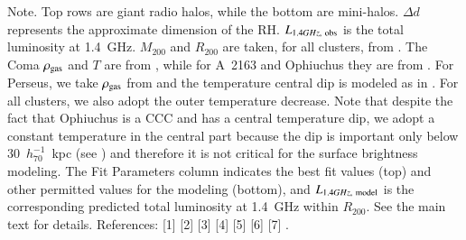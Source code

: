 \documentclass[traditabstract]{aa}
\begin{document}
\begin{table}[t]
\begin{center}
\label{tab:RadioHalos}
\end{center}
\footnotesize{Note. Top rows are giant radio halos, while the bottom are mini-halos. $\Delta d$ represents the approximate dimension of the RH. $L_{1.4 GHz,~\rm{obs}}$ is the total luminosity at 1.4~GHz. $M_{200}$ and $R_{200}$ are taken, for all clusters, from \cite{2002ApJ...567..716R}. The Coma $\rho_{\rm{gas}}$ and $T$ are from \cite{1992A&A...259L..31B}, while for A~2163 and Ophiuchus they are from \cite{2002ApJ...567..716R}. For Perseus, we take $\rho_{\rm{gas}}$ from \cite{2003ApJ...590..225C} and the temperature central dip is modeled as in \cite{2004A&A...413...17P}. For all clusters, we also adopt the outer temperature decrease. Note that despite the fact that Ophiuchus is a CCC and has a central temperature dip, we adopt a constant temperature in the central part because the dip is important only below $30$~$h_{70}^{-1}$~kpc (see \citealp{2010MNRAS.405.1624M}) and therefore it is not critical for the surface brightness modeling. The Fit Parameters column indicates the best fit values (top) and other permitted values for the modeling (bottom), and $L_{1.4 GHz,~\rm{model}}$ is the corresponding predicted total luminosity at 1.4~GHz within $R_{200}$. See the main text for details. References: [1] \cite{1997A&A...321...55D} [2] \cite{1992A&A...259L..31B} [3] \cite{2002ApJ...567..716R} [4] \cite{2009A&A...499..679M} [5] \cite{1990MNRAS.246..477P} [6] \cite{2003ApJ...590..225C} [7] \cite{2004A&A...413...17P}.}
\end{table}
\end{document}
